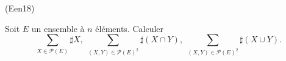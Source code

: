 \begin{tiny}(Een18)\end{tiny} Soit $E$ un ensemble à $n$ éléments. Calculer
\[
 \sum_{X \in \mathcal{P}(E)} \sharp X, \;
 \sum_{(X,Y) \in \mathcal{P}(E)^2} \sharp (X\cap Y), \;
 \sum_{(X,Y) \in \mathcal{P}(E)^2} \sharp (X\cup Y).
\]
